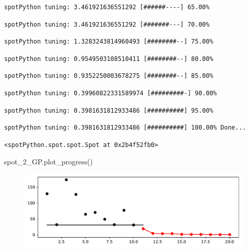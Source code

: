 \documentclass[
  letterpaper,
  DIV=11,
  numbers=noendperiod]{scrreprt}
\newenvironment{Shaded}{\begin{snugshade}}{\end{snugshade}}
\newcommand{\NormalTok}[1]{\textcolor[rgb]{0.00,0.23,0.31}{#1}}
\begin{document}
\begin{verbatim}
spotPython tuning: 3.461921636551292 [######----] 65.00% 
\end{verbatim}

\begin{verbatim}
spotPython tuning: 3.461921636551292 [#######---] 70.00% 
\end{verbatim}

\begin{verbatim}
spotPython tuning: 1.3283243814960493 [########--] 75.00% 
\end{verbatim}

\begin{verbatim}
spotPython tuning: 0.9549503108510411 [########--] 80.00% 
\end{verbatim}

\begin{verbatim}
spotPython tuning: 0.9352250003678275 [########--] 85.00% 
\end{verbatim}

\begin{verbatim}
spotPython tuning: 0.39960822331589974 [#########-] 90.00% 
\end{verbatim}

\begin{verbatim}
spotPython tuning: 0.3981631812933486 [##########] 95.00% 
\end{verbatim}

\begin{verbatim}
spotPython tuning: 0.3981631812933486 [##########] 100.00% Done...
\end{verbatim}

\begin{verbatim}
<spotPython.spot.spot.Spot at 0x2b4f52fb0>
\end{verbatim}

\begin{Shaded}
\begin{Highlighting}[]
\NormalTok{spot\_2\_GP.plot\_progress()}
\end{Highlighting}
\end{Shaded}

\begin{figure}[H]

{\centering \includegraphics{010_num_spot_sklearn_surrogate_files/figure-pdf/cell-18-output-1.pdf}

}

\end{figure}
\end{document}
